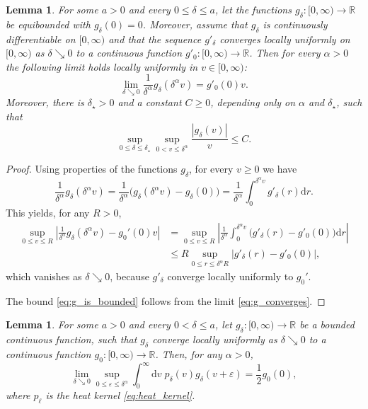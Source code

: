 \documentclass[oneside,final,11pt]{amsart}
\newtheorem{lemma}[thm]{Lemma}
\theoremstyle{definition}
\newcounter{assum}
\renewcommand{\d}{\mathrm{d}}
\newcommand{\R}{\mathbb{R}}
\newcommand{\1}[1]{\mathbf{1}_{#1}}
\newcommand{\eps}{\varepsilon}
\numberwithin{equation}{section}
\begin{document}
\begin{lemma}\label{lem:g_converges}
For some $a > 0$ and every $0 \leq \delta \leq a$, let the functions $g_{\delta} : [0, \infty) \to \R$ be equibounded with $g_\delta(0) = 0$. Moreover, assume that $g_\delta$ is continuously differentiable on $[0, \infty)$ and that the sequence $g'_\delta$ converges locally uniformly on $[0, \infty)$ as $\delta \searrow 0$ to a continuous function $g'_0 : [0, \infty) \to \R$. Then for every $\alpha > 0$ the following limit holds locally uniformly in $v \in [0, \infty)$:
\begin{equation}\label{eq:g_converges}
	\lim_{\delta \searrow 0} \frac{1}{\delta^\alpha} g_\delta (\delta^\alpha v) = g'_0(0) v.
\end{equation}
Moreover, there is $\delta_\star > 0$ and a constant $C \geq 0$, depending only on $\alpha$ and $\delta_\star$, such that
\begin{equation}\label{eq:g_is_bounded}
	\sup_{0 \leq \delta \leq \delta_\star} \sup_{0 < v \leq \delta^\alpha} \frac{|g_\delta(v)|}{v} \leq C.
\end{equation}
\end{lemma}

\begin{proof}
Using properties of the functions $g_\delta$, for every $v \geq 0$ we have
\begin{equation}
\frac{1}{\delta^\alpha} g_\delta (\delta^\alpha v) = \frac{1}{\delta^\alpha} \bigl(g_\delta (\delta^\alpha v) - g_\delta(0)\bigr) = \frac{1}{\delta^\alpha} \int_0^{\delta^\alpha v} g'_\delta (r) \d r.
\end{equation}
This yields, for any $R > 0$,
\begin{align}
\sup_{0 \leq v \leq R}\left|\frac{1}{\delta^\alpha} g_\delta (\delta^\alpha v) - g_0' (0) v \right|&= \sup_{0 \leq v \leq R} \left|\frac{1}{\delta^\alpha} \int_0^{\delta^\alpha v} \bigl(g'_\delta (r) - g'_0 (0) \bigr) \d r \right|\\
%
&\leq R \sup_{0 \leq r \leq \delta^\alpha R} \bigl| g'_\delta (r) - g'_0 (0) \bigr|,
\end{align}
which vanishes as $\delta \searrow 0$, because $g'_\delta$ converge locally uniformly to $g_0'$.

The bound \eqref{eq:g_is_bounded} follows from the limit \eqref{eq:g_converges}.
\end{proof}

\begin{lemma}\label{lem:heat2}
For some $a > 0$ and every $0 < \delta \leq a$, let $g_{\delta} : [0, \infty) \to \R$ be a bounded continuous function, such that $g_\delta$ converge locally uniformly as $\delta \searrow 0$ to a continuous function $g_0 : [0, \infty) \to \R$. Then, for any $\alpha > 0$,
\begin{equation}\label{eq:heat2}
\lim_{\delta \searrow 0} \sup_{0 \leq \eps \leq \delta^\alpha} \int_{0}^\infty \d v\; p_{\delta}(v) g_\delta(v + \eps) = \frac{1}{2} g_0(0),
\end{equation}
where $p_\ell$ is the heat kernel \eqref{eq:heat_kernel}.
\end{lemma}
\end{document}
